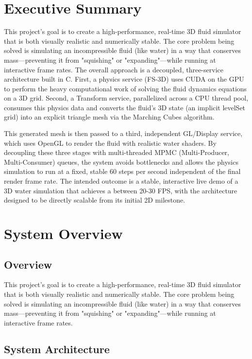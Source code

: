 \documentclass[12pt]{article}
\begin{document}
\section{Executive Summary}
This project's goal is to create a high-performance, real-time 3D fluid simulator that is both visually realistic and numerically stable. The core problem being solved is simulating an incompressible fluid (like water) in a way that conserves mass—preventing it from "squishing" or "expanding"—while running at interactive frame rates. The overall approach is a decoupled, three-service architecture built in C. First, a physics service (FS-3D) uses CUDA on the GPU to perform the heavy computational work of solving the fluid dynamics equations on a 3D grid. Second, a Transform service, parallelized across a CPU thread pool, consumes this physics data and converts the fluid's 3D state (an implicit levelSet grid) into an explicit triangle mesh via the Marching Cubes algorithm.

This generated mesh is then passed to a third, independent GL/Display service, which uses OpenGL to render the fluid with realistic water shaders. By decoupling these three stages with multi-threaded MPMC (Multi-Producer, Multi-Consumer) queues, the system avoids bottlenecks and allows the physics simulation to run at a fixed, stable 60 steps per second independent of the final render frame rate. The intended outcome is a stable, interactive live demo of a 3D water simulation that achieves a between 20-30 FPS, with the architecture designed to be directly scalable from its initial 2D milestone.

\section{System Overview}

\subsection{Overview}

This project's goal is to create a high-performance, real-time 3D fluid simulator that is both visually realistic and numerically stable. The core problem being solved is simulating an incompressible fluid (like water) in a way that conserves mass—preventing it from "squishing" or "expanding"—while running at interactive frame rates.

\subsection{System Architecture}
\end{document}

